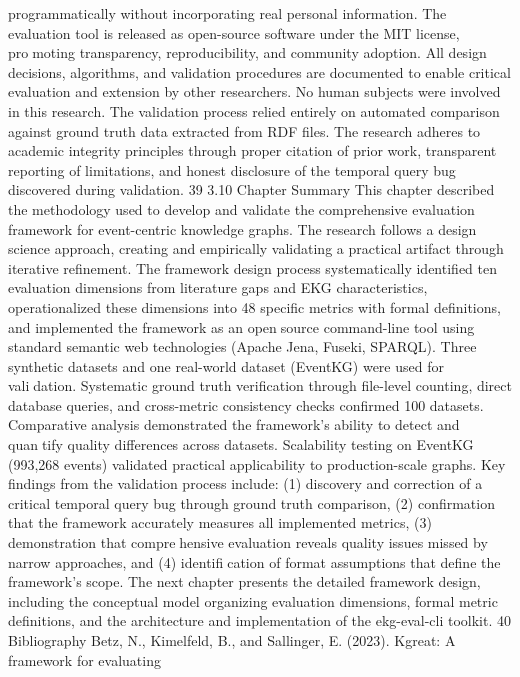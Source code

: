 programmatically without incorporating real personal information.
The evaluation tool is released as open-source software under the MIT license, promoting transparency, reproducibility, and community adoption. All design decisions,
algorithms, and validation procedures are documented to enable critical evaluation and
extension by other researchers.
No human subjects were involved in this research. The validation process relied
entirely on automated comparison against ground truth data extracted from RDF files.
The research adheres to academic integrity principles through proper citation of prior
work, transparent reporting of limitations, and honest disclosure of the temporal query
bug discovered during validation.
39
3.10 Chapter Summary
This chapter described the methodology used to develop and validate the comprehensive
evaluation framework for event-centric knowledge graphs. The research follows a design
science approach, creating and empirically validating a practical artifact through iterative
refinement.
The framework design process systematically identified ten evaluation dimensions
from literature gaps and EKG characteristics, operationalized these dimensions into 48
specific metrics with formal definitions, and implemented the framework as an opensource command-line tool using standard semantic web technologies (Apache Jena, Fuseki,
SPARQL).
Three synthetic datasets and one real-world dataset (EventKG) were used for validation. Systematic ground truth verification through file-level counting, direct database
queries, and cross-metric consistency checks confirmed 100%
datasets. Comparative analysis demonstrated the framework’s ability to detect and quantify quality differences across datasets. Scalability testing on EventKG (993,268 events)
validated practical applicability to production-scale graphs.
Key findings from the validation process include: (1) discovery and correction of a
critical temporal query bug through ground truth comparison, (2) confirmation that the
framework accurately measures all implemented metrics, (3) demonstration that comprehensive evaluation reveals quality issues missed by narrow approaches, and (4) identification of format assumptions that define the framework’s scope.
The next chapter presents the detailed framework design, including the conceptual
model organizing evaluation dimensions, formal metric definitions, and the architecture
and implementation of the ekg-eval-cli toolkit.
40
Bibliography
Betz, N., Kimelfeld, B., and Sallinger, E. (2023). Kgreat: A framework for evaluating
